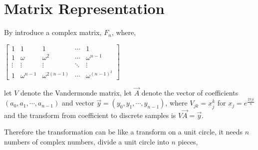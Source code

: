 \documentclass[12pt]{article}
\begin{document}
	
	\section{Matrix Representation}
		By introduce a complex matrix, $F_{n}$, where,
		
		\begin{center}
			\centering
			
			$
			\begin{bmatrix}
			1 & 1 & 1 & \cdots & 1 \\
			1 & \omega & \omega^{2} & \cdots & \omega^{n-1} \\
			\vdots & \vdots & \vdots & \ddots & \vdots \\
			1 & \omega^{n-1} & \omega^{2(n-1)} & \cdots & \omega^{(n-1)^{2}}
			\end{bmatrix}
			$
			
			
		\end{center}
		let $V$ denote the Vandermonde matrix, let $\vec{A}$ denote the vector of coefficients $(a_{0}, a_{1}, \cdots, a_{n-1})$ and vector $\vec{y} = (y_{0}, y_{1}, \cdots, y_{n-1})$, where $V_{jk} = x_{j}^{k}$ for $x_{j} = e^{\frac{2\pi ji}{n}}$ and the transform from coefficient to discrete samples is $V\vec{A} = \vec{y}$.
		
		Therefore the transformation can be like a transform on a unit circle, it needs $n$ numbers of complex numbers, divide a unit circle into $n$ pieces,
		
\end{document}

